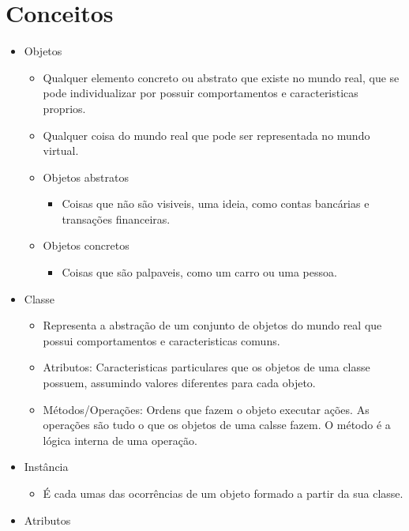 \documentclass[12pt]{article}
\begin{document}
\section{Conceitos}
\begin{itemize}
    \item Objetos
    \begin{itemize}
        \item Qualquer elemento concreto ou abstrato que existe no mundo real, 
        que se pode individualizar por possuir comportamentos e caracteristicas 
        proprios.
        \item Qualquer coisa do mundo real que pode ser representada no mundo 
        virtual.
        \item Objetos abstratos
        \begin{itemize}
            \item Coisas que não são visiveis, uma ideia, como contas 
            bancárias e transações financeiras.
        \end{itemize}
        \item Objetos concretos
        \begin{itemize}
            \item Coisas que são palpaveis, como um carro ou uma pessoa.
        \end{itemize}
    \end{itemize}
    \item Classe
    \begin{itemize}
        \item Representa a abstração de um conjunto de objetos do mundo real 
        que possui comportamentos e caracteristicas comuns.
        \item Atributos: Caracteristicas particulares que os objetos de uma 
        classe possuem, assumindo valores diferentes para cada objeto.
        \item Métodos/Operações: Ordens que fazem o objeto executar ações. As 
        operações são tudo o que os objetos de uma calsse fazem. O método é a 
        lógica interna de uma operação. 
    \end{itemize}
    \item Instância
    \begin{itemize}
        \item É cada umas das ocorrências de um objeto formado a partir da 
        sua classe.
    \end{itemize}
    \item Atributos
    \begin{itemize}

\end{itemize}
\end{itemize}
\end{document}
